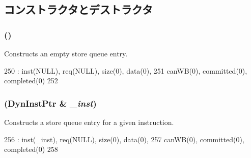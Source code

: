 \subsection{コンストラクタとデストラクタ}
\hypertarget{structOzoneLSQ_1_1SQEntry_a3e45ad78b5babe810aa50349be32637b}{
\subsubsection[{SQEntry}]{ ()}}
\label{structOzoneLSQ_1_1SQEntry_a3e45ad78b5babe810aa50349be32637b}
Constructs an empty store queue entry. 


\begin{DoxyCode}
250             : inst(NULL), req(NULL), size(0), data(0),
251               canWB(0), committed(0), completed(0)
252         { }
\end{DoxyCode}
\hypertarget{structOzoneLSQ_1_1SQEntry_a3b163ba1f4e957334b0fe8a659562015}{
\subsubsection[{SQEntry}]{ ({\bf DynInstPtr} \& {\em \_\-inst})}}
\label{structOzoneLSQ_1_1SQEntry_a3b163ba1f4e957334b0fe8a659562015}
Constructs a store queue entry for a given instruction. 


\begin{DoxyCode}
256             : inst(_inst), req(NULL), size(0), data(0),
257               canWB(0), committed(0), completed(0)
258         { }
\end{DoxyCode}


